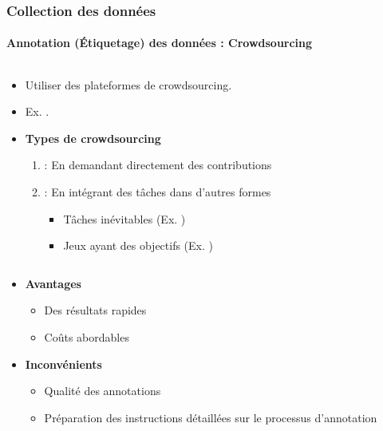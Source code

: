 \documentclass[xcolor=table]{beamer}
\begin{document}
\begin{frame}
\frametitle{Collection des données}
\framesubtitle{Annotation (Étiquetage) des données : Crowdsourcing}

\begin{columns}
\begin{column}{0.78\textwidth}
\begin{itemize}
	\item Utiliser des plateformes de crowdsourcing.
	\item Ex. .
	\item \textbf{Types de crowdsourcing}
	\begin{enumerate}
		\item {} : En demandant directement des contributions
		\item {} : En intégrant des tâches dans d’autres formes
		\begin{itemize}
			\item Tâches inévitables (Ex. )
			\item Jeux ayant des objectifs (Ex. )
		\end{itemize}
	\end{enumerate}
\end{itemize}
\end{column}
\begin{column}{0.22\textwidth}
\end{column}
\end{columns}

\begin{itemize}
	\item \textbf{Avantages} 
	\begin{itemize}
		\item Des résultats rapides
		\item Coûts abordables
	\end{itemize}
	\item \textbf{Inconvénients}
	\begin{itemize}
		\item Qualité des annotations
		\item Préparation des instructions détaillées sur le processus d'annotation
	\end{itemize}
\end{itemize}

\end{frame}
\end{document}
